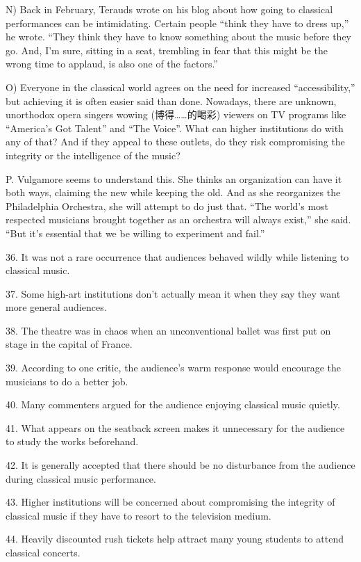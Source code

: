 \documentclass[UTF8,11pt]{ctexart}
\begin{document}
N) Back in February, Terauds wrote on his blog about how going to classical performances can be intimidating. Certain people “think they have to dress up,” he wrote. “They think they have to know something about the music before they go. And, I’m sure, sitting in a seat, trembling in fear that this might be the wrong time to applaud, is also one of the factors.”


O) Everyone in the classical world agrees on the need for increased “accessibility,” but achieving it is often easier said than done. Nowadays, there are unknown, unorthodox opera singers wowing (博得……的喝彩) viewers on TV programs like “America’s Got Talent” and “The Voice”. What can higher institutions do with any of that? And if they appeal to these outlets, do they risk compromising the integrity or the intelligence of the music?


P. Vulgamore seems to understand this. She thinks an organization can have it both ways, claiming the new while keeping the old. And as she reorganizes the Philadelphia Orchestra, she will attempt to do just that. “The world’s most respected musicians brought together as an orchestra will always exist,” she said. “But it’s essential that we be willing to experiment and fail.”


36. It was not a rare occurrence that audiences behaved wildly while listening to classical music.


37. Some high-art institutions don’t actually mean it when they say they want more general audiences.


38. The theatre was in chaos when an unconventional ballet was first put on stage in the capital of France.


39. According to one critic, the audience’s warm response would encourage the musicians to do a better job.


40. Many commenters argued for the audience enjoying classical music quietly.


41. What appears on the seatback screen makes it unnecessary for the audience to study the works beforehand.


42. It is generally accepted that there should be no disturbance from the audience during classical music performance.


43. Higher institutions will be concerned about compromising the integrity of classical music if they have to resort to the television medium.


44. Heavily discounted rush tickets help attract many young students to attend classical concerts.
\end{document}
